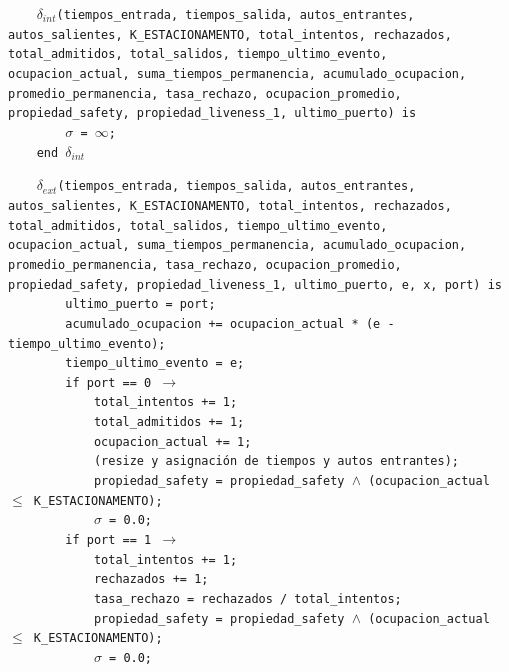 \documentclass[12pt]{article}
\begin{document}
\begin{tcolorbox}[
    colback=black!5!white,
    colframe=black!80!white,
    boxrule=0.8pt,
    arc=2pt,
    left=5pt,
    right=5pt,
    top=5pt,
    bottom=5pt,
    fontupper=\ttfamily,
    breakable
]
\begin{flushleft}
\texttt{~~~~}$\delta_{int}$\texttt{(tiempos\_entrada, tiempos\_salida, autos\_entrantes, autos\_salientes, K\_ESTACIONAMENTO, total\_intentos, rechazados, total\_admitidos, total\_salidos, tiempo\_ultimo\_evento, ocupacion\_actual, suma\_tiempos\_permanencia, acumulado\_ocupacion, promedio\_permanencia, tasa\_rechazo, ocupacion\_promedio, propiedad\_safety, propiedad\_liveness\_1, ultimo\_puerto) is} \\
\texttt{~~~~~~~~}$\sigma$\texttt{ = }\(\infty\)\texttt{;} \\
\texttt{~~~~end }$\delta_{int}$
\end{flushleft}

\begin{flushleft}
\texttt{~~~~}$\delta_{ext}$\texttt{(tiempos\_entrada, tiempos\_salida, autos\_entrantes, autos\_salientes, K\_ESTACIONAMENTO, total\_intentos, rechazados, total\_admitidos, total\_salidos, tiempo\_ultimo\_evento, ocupacion\_actual, suma\_tiempos\_permanencia, acumulado\_ocupacion, promedio\_permanencia, tasa\_rechazo, ocupacion\_promedio, propiedad\_safety, propiedad\_liveness\_1, ultimo\_puerto, e, x, port) is} \\
\texttt{~~~~~~~~ultimo\_puerto = port;} \\
\texttt{~~~~~~~~acumulado\_ocupacion += ocupacion\_actual * (e - tiempo\_ultimo\_evento);} \\
\texttt{~~~~~~~~tiempo\_ultimo\_evento = e;} \\[3pt]

\texttt{~~~~~~~~if port == 0 }\(\rightarrow\) \\
\texttt{~~~~~~~~~~~~total\_intentos += 1;} \\
\texttt{~~~~~~~~~~~~total\_admitidos += 1;} \\
\texttt{~~~~~~~~~~~~ocupacion\_actual += 1;} \\
\texttt{~~~~~~~~~~~~(resize y asignación de tiempos y autos entrantes);} \\
\texttt{~~~~~~~~~~~~propiedad\_safety = propiedad\_safety }\(\land\)\texttt{ (ocupacion\_actual }\(\leq\)\texttt{ K\_ESTACIONAMENTO);} \\
\texttt{~~~~~~~~~~~~}$\sigma$\texttt{ = 0.0;} \\[3pt]

\texttt{~~~~~~~~if port == 1 }\(\rightarrow\) \\
\texttt{~~~~~~~~~~~~total\_intentos += 1;} \\
\texttt{~~~~~~~~~~~~rechazados += 1;} \\
\texttt{~~~~~~~~~~~~tasa\_rechazo = rechazados / total\_intentos;} \\
\texttt{~~~~~~~~~~~~propiedad\_safety = propiedad\_safety }\(\land\)\texttt{ (ocupacion\_actual }\(\leq\)\texttt{ K\_ESTACIONAMENTO);} \\
\texttt{~~~~~~~~~~~~}$\sigma$\texttt{ = 0.0;} \\[3pt]


\end{flushleft}
\end{tcolorbox}
\end{document}
